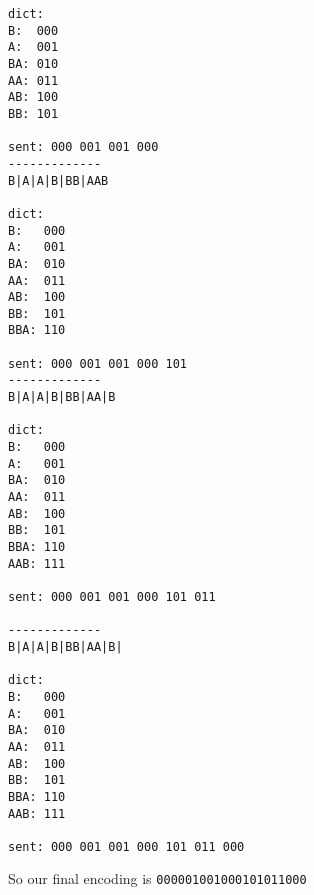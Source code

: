 \begin{enumerate}
\begin{enumerate}
\begin{verbatim}
dict:
B:  000
A:  001
BA: 010
AA: 011
AB: 100
BB: 101

sent: 000 001 001 000
-------------
B|A|A|B|BB|AAB

dict:
B:   000
A:   001
BA:  010
AA:  011
AB:  100
BB:  101
BBA: 110

sent: 000 001 001 000 101
-------------
B|A|A|B|BB|AA|B

dict:
B:   000
A:   001
BA:  010
AA:  011
AB:  100
BB:  101
BBA: 110
AAB: 111

sent: 000 001 001 000 101 011

-------------
B|A|A|B|BB|AA|B|

dict:
B:   000
A:   001
BA:  010
AA:  011
AB:  100
BB:  101
BBA: 110
AAB: 111

sent: 000 001 001 000 101 011 000
\end{verbatim}

So our final encoding is \texttt{000001001000101011000}





            \end{enumerate}










    
\end{enumerate}

